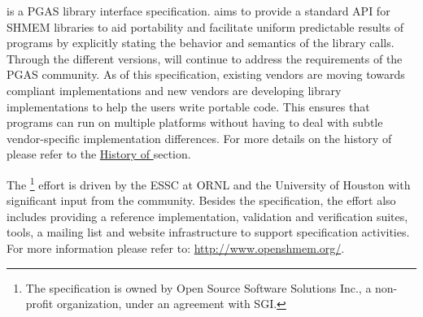 \openshmem is a \ac{PGAS} library interface specification. \openshmem 
aims to provide a standard \ac{API} for SHMEM libraries to aid portability and
facilitate uniform predictable results of \openshmem programs by explicitly
stating the behavior and semantics of the \openshmem library calls. Through the
different versions, \openshmem will continue to address the requirements of the
\ac{PGAS} community.  As of this specification, existing vendors are moving
towards \openshmem compliant implementations and new vendors are developing
\openshmem library implementations to help the users write portable \openshmem
code. This ensures that programs can run on multiple platforms without having to
deal with subtle vendor-specific implementation differences. For more details on
the history of \openshmem please refer to the
\hyperref[sec:openshmem_history]{History of \openshmem} section.  

The \openshmem\footnote{The \openshmem specification is owned by Open Source
Software Solutions Inc., a non-profit organization, under an agreement with
SGI.}  effort is driven by the \ac{ESSC} at \ac{ORNL} and the University of
Houston with significant input from the \openshmem community. Besides the
specification, the effort also includes providing a reference \openshmem
implementation, validation and verification suites, tools, a mailing list and
website infrastructure to support specification activities. For more information
please refer to: \url{http://www.openshmem.org/}.

